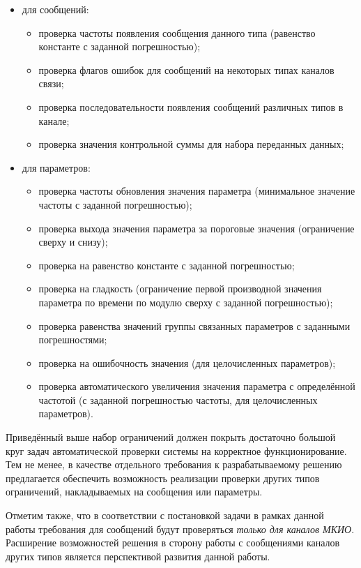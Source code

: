 \begin{itemize}
 \item для сообщений:
 \begin{itemize}
  \item проверка частоты появления сообщения данного типа (равенство константе 
с заданной погрешностью);
  \item проверка флагов ошибок для сообщений на некоторых типах каналов связи;
  \item проверка последовательности появления сообщений различных типов в 
канале;
  \item проверка значения контрольной суммы для набора переданных данных;
 \end{itemize}
 \item для параметров:
 \begin{itemize}
  \item проверка частоты обновления значения параметра (минимальное значение 
частоты с заданной погрешностью);
  \item проверка выхода значения параметра за пороговые значения (ограничение 
сверху и снизу);
  \item проверка на равенство константе с заданной погрешностью;
  \item проверка на гладкость (ограничение первой производной значения 
параметра по времени по модулю сверху с заданной погрешностью);
  \item проверка равенства значений группы связанных параметров с заданными 
погрешностями;
  \item проверка на ошибочность значения (для целочисленных параметров);
  \item проверка автоматического увеличения значения параметра с определённой 
частотой (с заданной погрешностью частоты, для целочисленных параметров).
 \end{itemize}
\end{itemize}

Приведённый выше набор ограничений должен покрыть достаточно большой круг задач 
автоматической проверки системы на корректное функционирование. Тем не менее, 
в качестве отдельного требования к разрабатываемому решению предлагается 
обеспечить возможность реализации проверки других типов ограничений, 
накладываемых на сообщения или параметры.

Отметим также, что в соответствии с постановкой задачи в рамках данной работы 
требования для сообщений будут проверяться \textit{только для каналов МКИО}. 
Расширение возможностей решения в сторону работы с сообщениями каналов других 
типов является перспективой развития данной работы.


